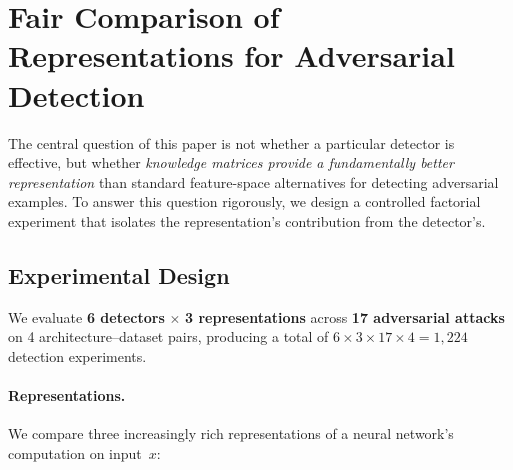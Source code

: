 %


\section{Fair Comparison of Representations for Adversarial Detection}
\label{sec:representation_comparison}

The central question of this paper is not whether a particular detector is effective, but whether \emph{knowledge matrices provide a fundamentally better representation} than standard feature-space alternatives for detecting adversarial examples.
To answer this question rigorously, we design a controlled factorial experiment that isolates the representation's contribution from the detector's.

\subsection{Experimental Design}
\label{sec:exp_design}

We evaluate \textbf{6 detectors} $\times$ \textbf{3 representations} across \textbf{17 adversarial attacks} on 4 architecture--dataset pairs, producing a total of $6 \times 3 \times 17 \times 4 = 1{,}224$ detection experiments.

\paragraph{Representations.}
We compare three increasingly rich representations of a neural network's computation on input~$x$:

